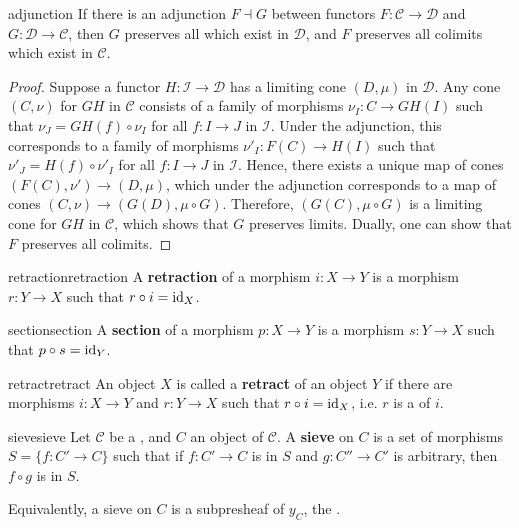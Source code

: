 \begin{example}{adjunction}
    If there is an adjunction $F \dashv G$ between functors $F \colon \mathcal{C} \to \mathcal{D}$ and $G \colon \mathcal{D} \to \mathcal{C}$, then $G$ preserves all  which exist in $\mathcal{D}$, and $F$ preserves all colimits which exist in $\mathcal{C}$.
    \begin{proof}
        Suppose a functor $H \colon \mathcal{I} \to \mathcal{D}$ has a limiting cone $(D, \mu)$ in $\mathcal{D}$. Any cone $(C, \nu)$ for $GH$ in $\mathcal{C}$ consists of a family of morphisms $\nu_I \colon C \to GH(I)$ such that $\nu_J = GH(f) \circ \nu_I$ for all $f \colon I \to J$ in $\mathcal{I}$. Under the adjunction, this corresponds to a family of morphisms $\nu'_I \colon F(C) \to H(I)$ such that $\nu'_J = H(f) \circ \nu'_I$ for all $f \colon I \to J$ in $\mathcal{I}$. Hence, there exists a unique map of cones $(F(C), \nu') \to (D, \mu)$, which under the adjunction corresponds to a map of cones $(C, \nu) \to (G(D), \mu \circ G)$. Therefore, $(G(C), \mu \circ G)$ is a limiting cone for $GH$ in $\mathcal{C}$, which shows that $G$ preserves limits. Dually, one can show that $F$ preserves all colimits.
    \end{proof}
\end{example}

\begin{topic}{retraction}{retraction}
    A \textbf{retraction} of a morphism $i \colon X \to Y$ is a morphism $r \colon Y \to X$ such that $r \circ i = \textup{id}_X$.
\end{topic}

\begin{topic}{section}{section}
    A \textbf{section} of a morphism $p \colon X \to Y$ is a morphism $s \colon Y \to X$ such that $p \circ s = \textup{id}_Y$.
\end{topic}

\begin{topic}{retract}{retract}
    An object $X$ is called a \textbf{retract} of an object $Y$ if there are morphisms $i \colon X \to Y$ and $r \colon Y \to X$ such that $r \circ i = \textup{id}_X$, i.e. $r$ is a  of $i$.
\end{topic}

\begin{topic}{sieve}{sieve}
    Let $\mathcal{C}$ be a , and $C$ an object of $\mathcal{C}$. A \textbf{sieve} on $C$ is a set of morphisms $S = \{ f \colon C' \to C \}$ such that if $f \colon C' \to C$ is in $S$ and $g \colon C'' \to C'$ is arbitrary, then $f \circ g$ is in $S$.
    
    Equivalently, a sieve on $C$ is a subpresheaf of $y_C$, the .
\end{topic}

